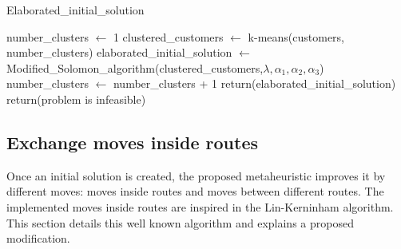 \clearpage

\begin{algorithm}[H]
	\caption{Elaborated\_initial\_solution}
	\label{algoritmoCluser}
	\begin{algorithmic}[1]
		\STATE number\_clusters $\leftarrow$ 1																	  
		\STATE    clustered\_customers   $\leftarrow$ k-means(customers, number\_clusters)                                											  
		\STATE   elaborated\_initial\_solution   $\leftarrow$ Modified\_Solomon\_algorithm(clustered\_customers,$\lambda,\alpha_{1},\alpha_{2},\alpha_{3}$)		      
		\STATE number\_clusters $\leftarrow$	number\_clusters + 1         	
		\ENDWHILE						  
		\STATE return(elaborated\_initial\_solution)																  
		\ELSE
		\STATE	return(problem is infeasible)		
		\ENDIF
	\end{algorithmic}
\end{algorithm}

\subsection{Exchange moves inside routes}\label{MovesInsideRoutes}

Once an initial solution is created, the proposed metaheuristic improves it by different moves: moves inside routes and moves between different routes. The implemented moves inside routes are inspired in the Lin-Kerninham algorithm. This section details this well known algorithm and explains a proposed modification.

